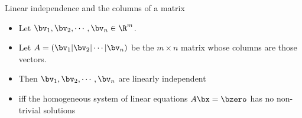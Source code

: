 \documentclass[handout]{beamer}
\begin{document}

\begin{frame}{Linear independence and the columns of a matrix}

\begin{itemize}
\item Let $\bv_1,\bv_2,\cdots,\bv_n \in \R^m$.
\item Let $A =\left ( \bv_1 \vert \bv_2 \vert \cdots \vert \bv_n \right)$
be the $m\times n$ matrix whose columns are those vectors.
\item Then $\bv_1,\bv_2,\cdots,\bv_n$ are linearly independent
\item iff the homogeneous system of linear equations $A\bx=\bzero$ has no non-trivial solutions
\end{itemize}

\end{frame}
\end{document}

